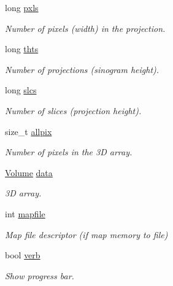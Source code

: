\begin{DoxyCompactItemize}
\item 
long \hyperlink{classSinoS_ac5305ea20cccd56afff6cf909f3da3d6}{pxls}
\begin{DoxyCompactList}\small\item\em Number of pixels (width) in the projection. \item\end{DoxyCompactList}\item 
long \hyperlink{classSinoS_af08e78d111d1fc7862f783274adbd57f}{thts}
\begin{DoxyCompactList}\small\item\em Number of projections (sinogram height). \item\end{DoxyCompactList}\item 
long \hyperlink{classSinoS_a6e86c08cdb03820099546867a6d27814}{slcs}
\begin{DoxyCompactList}\small\item\em Number of slices (projection height). \item\end{DoxyCompactList}\item 
size\_\-t \hyperlink{classSinoS_a3026a431a66f2b87d6a47378cd115a6b}{allpix}
\begin{DoxyCompactList}\small\item\em Number of pixels in the 3D array. \item\end{DoxyCompactList}\item 
\hyperlink{group__Types_ga556356a8f294cbe88e8695c7c91cfe08}{Volume} \hyperlink{classSinoS_a3dd5dabaa38f646efc6289bb4caca6c4}{data}
\begin{DoxyCompactList}\small\item\em 3D array. \item\end{DoxyCompactList}\item 
int \hyperlink{classSinoS_acd76bc4567a80d9fcd66e936a35a9a17}{mapfile}
\begin{DoxyCompactList}\small\item\em Map file descriptor (if map memory to file) \item\end{DoxyCompactList}\item 
bool \hyperlink{classSinoS_aaf5cf61cb386b132028f78310d070569}{verb}
\begin{DoxyCompactList}\small\item\em Show progress bar. \item\end{DoxyCompactList}\end{DoxyCompactItemize}
